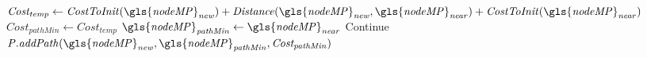 \begin{algorithm}[H]
\begin{algorithmic}[1]
      \State $\mathit{Cost_{temp} \leftarrow CostToInit(\gls{nodeMP}_{new}) + Distance(\gls{nodeMP}_{new}, \gls{nodeMP}_{near})} + \mathit{CostToInit(\gls{nodeMP}_{near})}$
      \State $\mathit{Cost_{pathMin}} \leftarrow \mathit{Cost_{temp}}$
      \State $\mathit{\gls{nodeMP}_{pathMin} \leftarrow \gls{nodeMP}_{near}}$
      \EndIf
      \EndIf
      \State Continue
      \Else
      \State $\mathit{P.addPath(\gls{nodeMP}_{new}, \gls{nodeMP}_{pathMin}, Cost_{pathMin})}$
      \EndIf
      \EndFor
    \EndWhile
  \end{algorithmic}
\end{algorithm}

